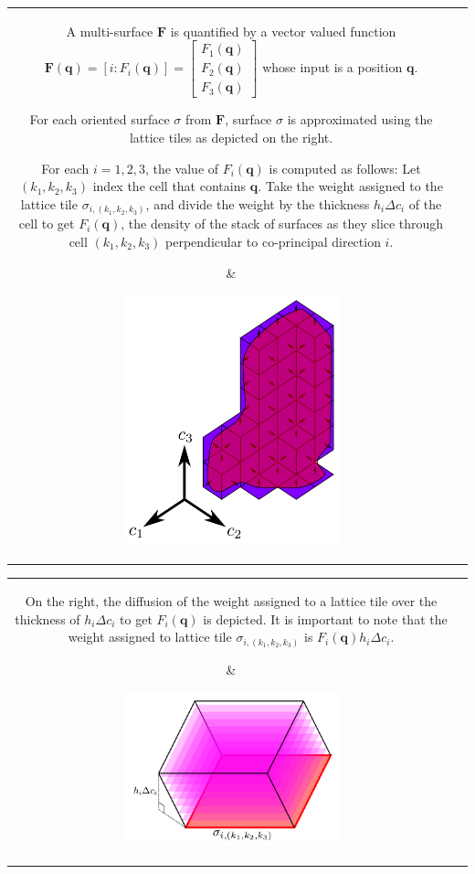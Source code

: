 \documentclass{book}
\begin{document}
\begin{tabular}{cc}
\parbox{0.5\textwidth}{
A multi-surface \(\mathbf{F}\) is quantified by a vector valued function \(\mathbf{F}(\mathbf{q}) = [i : F_i(\mathbf{q})] = \begin{bmatrix} F_1(\mathbf{q}) \\ F_2(\mathbf{q}) \\ F_3(\mathbf{q}) \end{bmatrix}\) whose input is a position \(\mathbf{q}\). 

For each oriented surface \(\sigma\) from \(\mathbf{F}\), surface \(\sigma\) is approximated using the lattice tiles as depicted on the right. 

For each \(i = 1, 2, 3\), the value of \(F_i(\mathbf{q})\) is computed as follows: Let \((k_1, k_2, k_3)\) index the cell that contains \(\mathbf{q}\). Take the weight assigned to the lattice tile \(\sigma_{i,(k_1,k_2,k_3)}\), and divide the weight by the thickness \(h_i \Delta c_i\) of the cell to get \(F_i(\mathbf{q})\), the density of the stack of surfaces as they slice through cell \((k_1, k_2, k_3)\) perpendicular to co-principal direction \(i\).
} & \parbox{0.5\textwidth}{
\includegraphics[width = 0.5\textwidth]{Coordinate_systems/approximating_a_surface}
}
\end{tabular}

\begin{tabular}{cc}
\parbox{0.5\textwidth}{
On the right, the diffusion of the weight assigned to a lattice tile over the thickness of \(h_i \Delta c_i\) to get \(F_i(\mathbf{q})\) is depicted. It is important to note that the weight assigned to lattice tile \(\sigma_{i,(k_1,k_2,k_3)}\) is \(F_i(\mathbf{q}) h_i \Delta c_i\).
} & \parbox{0.5\textwidth}{
\includegraphics[width = 0.5\textwidth]{Coordinate_systems/tile_weight_diffusion}
}
\end{tabular}
\end{document}
